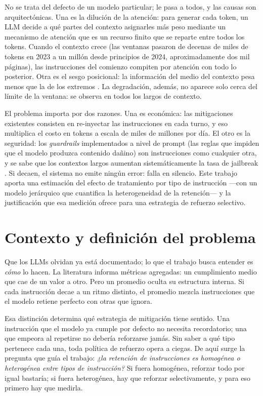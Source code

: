 \documentclass[12pt]{article}
\begin{document}
No se trata del defecto de un modelo particular; le pasa a todos, y las causas son
arquitectónicas. Una es la dilución de la atención: para generar cada token, un
LLM decide a qué partes del contexto asignarles más peso mediante un mecanismo de
atención que es un recurso finito que se reparte entre todos los tokens. Cuando el
contexto crece (las ventanas pasaron de decenas de miles de tokens en 2023 a un
millón desde principios de 2024, aproximadamente dos mil páginas), las
instrucciones del comienzo compiten por atención con todo lo posterior. Otra es el
sesgo posicional: la información del medio del contexto pesa menos que la de los
extremos \citep{liu2024}. La degradación, además, no aparece solo cerca del límite
de la ventana: se observa en todos los largos de contexto.

El problema importa por dos razones. Una es económica: las mitigaciones existentes
consisten en re-inyectar las instrucciones en cada turno, y eso multiplica el
costo en tokens a escala de miles de millones por día. El otro es la seguridad:
los \emph{guardrails} implementados a nivel de prompt (las reglas que impiden que
el modelo produzca contenido dañino) son instrucciones como cualquier otra, y se
sabe que los contextos largos aumentan sistemáticamente la tasa de jailbreak
\citep{anil2024}. Si decaen, el sistema no emite ningún error: falla en silencio.
Este trabajo aporta una estimación del efecto de tratamiento por tipo de
instrucción ---con un modelo jerárquico que cuantifica la heterogeneidad de la
retención--- y la justificación que esa medición ofrece para una estrategia de
refuerzo selectivo.

\section{Contexto y definición del problema}

Que los LLMs olvidan ya está documentado; lo que el trabajo busca entender es
\emph{cómo} lo hacen. La literatura informa métricas agregadas: un cumplimiento
medio que cae de un valor a otro. Pero un promedio oculta su estructura interna.
Si cada instrucción decae a un ritmo distinto, el promedio mezcla instrucciones
que el modelo retiene perfecto con otras que ignora.

Esa distinción determina qué estrategia de mitigación tiene sentido. Una
instrucción que el modelo ya cumple por defecto no necesita recordatorio; una que
empeora al repetirse no debería reforzarse jamás. Sin saber a qué tipo pertenece
cada una, toda política de refuerzo opera a ciegas. De aquí surge la pregunta que
guía el trabajo: \emph{¿la retención de instrucciones es homogénea o heterogénea
entre tipos de instrucción?} Si fuera homogénea, reforzar todo por igual bastaría;
si fuera heterogénea, hay que reforzar selectivamente, y para eso primero hay que
medirla.
\end{document}
